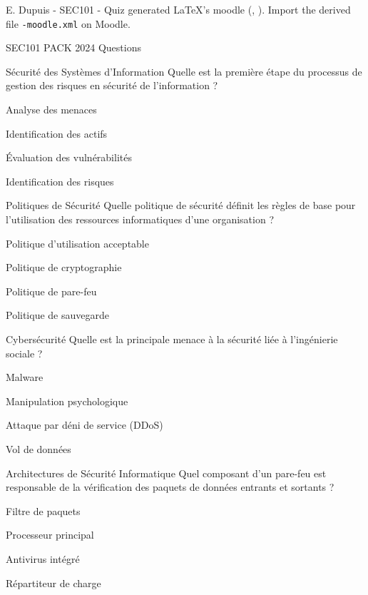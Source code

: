 \documentclass[12pt]{article}
\begin{document}
E. Dupuis - SEC101 - Quiz generated \LaTeX's \textsf{moodle} (\moodleversion, \moodledate). Import the derived file \texttt{\jobname-moodle.xml} on Moodle.
  
\begin{quiz}{SEC101 PACK 2024 Questions}

  \begin{multi}[points=1, tags={M1Sec101, Risques}]{Sécurité des Systèmes d'Information}
    Quelle est la première étape du processus de gestion des risques en sécurité de l'information ?
    \item Analyse des menaces
    \item Identification des actifs
    \item Évaluation des vulnérabilités
    \item* Identification des risques
  \end{multi}

  \begin{multi}[points=1,tags={M2Sec101, PSSI}]{Politiques de Sécurité}
    Quelle politique de sécurité définit les règles de base pour l'utilisation des ressources informatiques d'une organisation ?
    \item* Politique d'utilisation acceptable
    \item Politique de cryptographie
    \item Politique de pare-feu
    \item Politique de sauvegarde
  \end{multi}

  \begin{multi}[points=1]{Cybersécurité}
    Quelle est la principale menace à la sécurité liée à l'ingénierie sociale ?
    \item Malware
    \item* Manipulation psychologique
    \item Attaque par déni de service (DDoS)
    \item Vol de données
  \end{multi}

  \begin{multi}[points=1]{Architectures de Sécurité Informatique}
    Quel composant d'un pare-feu est responsable de la vérification des paquets de données entrants et sortants ?
    \item* Filtre de paquets
    \item Processeur principal
    \item Antivirus intégré
    \item Répartiteur de charge
  \end{multi}


\end{quiz}
\end{document}
